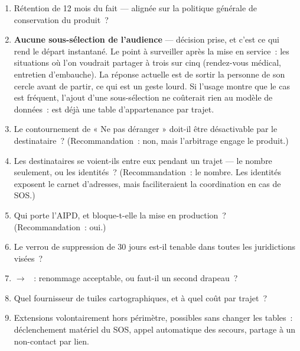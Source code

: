 \begin{enumerate}[leftmargin=1.6em]
  \item Rétention de 12 mois du fait  --- alignée sur la politique générale de
        conservation du produit~?
  \item \textbf{Aucune sous-sélection de l'audience} --- décision prise, et c'est ce qui
        rend le départ instantané. Le point à surveiller après la mise en service~: les
        situations où l'on voudrait partager à trois sur cinq (rendez-vous médical,
        entretien d'embauche). La réponse actuelle est de sortir la personne de son cercle
        avant de partir, ce qui est un geste lourd. Si l'usage montre que le cas est
        fréquent, l'ajout d'une sous-sélection ne coûterait rien au modèle de données~:
         est déjà une table d'appartenance par trajet.
  \item Le contournement de « Ne pas déranger » doit-il être désactivable par le
        destinataire~? (Recommandation~: non, mais l'arbitrage engage le produit.)
  \item Les destinataires se voient-ils entre eux pendant un trajet --- le nombre seulement,
        ou les identités~? (Recommandation~: le nombre. Les identités exposent le carnet
        d'adresses, mais faciliteraient la coordination en cas de SOS.)
  \item Qui porte l'AIPD, et bloque-t-elle la mise en production~? (Recommandation~: oui.)
  \item Le verrou de suppression de 30 jours est-il tenable dans toutes les juridictions
        visées~?
  \item {} $\rightarrow$ ~:
        renommage acceptable, ou faut-il un second drapeau~?
  \item Quel fournisseur de tuiles cartographiques, et à quel coût par trajet~?
  \item Extensions volontairement hors périmètre, possibles sans changer les tables~:
        déclenchement matériel du SOS, appel automatique des secours, partage à un
        non-contact par lien.
\end{enumerate}
